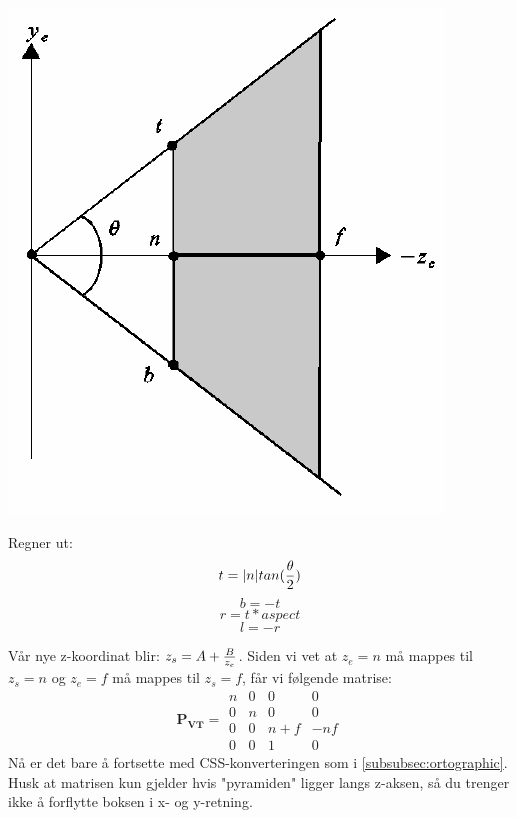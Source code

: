 \includegraphics[width=\textwidth]{Bilder/perspective.PNG}

Regner ut:
\begin{equation}
    t = |n|tan({\theta \over 2})
\end{equation}
\begin{equation}
    b = -t
\end{equation}
\begin{equation}
    r = t*aspect
\end{equation}
\begin{equation}
    l = -r
\end{equation}

Vår nye z-koordinat blir: $z_s = A + {B \over z_e}$. Siden vi vet at $z_e=n$ må mappes til $z_s=n$ og $z_e=f$ må mappes til $z_s=f$, får vi følgende matrise:
\begin{equation}
    \boldsymbol{P_{VT}}=
    \begin{matrix}
        n & 0 & 0 & 0 \\
        0 & n & 0 & 0 \\
        0 & 0 & n+f & -nf \\
        0 & 0 & 1 & 0
    \end{matrix}
\end{equation}
Nå er det bare å fortsette med CSS-konverteringen som i \ref{subsubsec:ortographic}. Husk at matrisen kun gjelder hvis "pyramiden" ligger langs z-aksen, så du trenger ikke å forflytte boksen i x- og y-retning.

